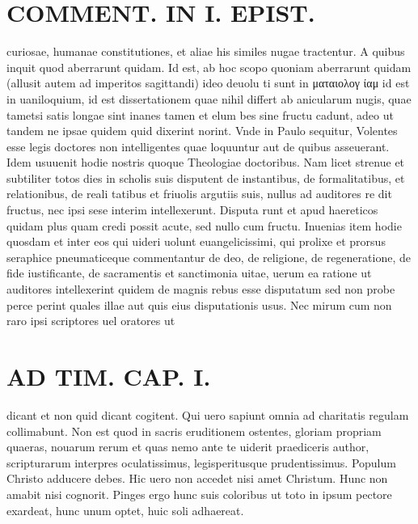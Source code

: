 \documentclass{article}
\begin{document}
\begin{pages}
\section*{COMMENT. IN I. EPIST. }\pstart curiosae, humanae constitutiones, et aliae his similes nugae tractentur. A quibus inquit quod aberrarunt quidam. Id est, ab hoc scopo quoniam aberrarunt quidam (allusit autem ad imperitos sagittandi) ideo deuolu ti sunt in ματαιολογ ίαμ id est in uaniloquium, id est dissertationem quae nihil differt ab anicularum nugis, quae tametsi satis longae sint inanes tamen et elum bes sine fructu cadunt, adeo ut tandem ne ipsae quidem quid dixerint norint. Vnde in Paulo sequitur, Volentes esse legis doctores non intelligentes quae loquuntur aut de quibus asseuerant. Idem usuuenit hodie nostris quoque Theologiae doctoribus. Nam licet strenue et subtiliter totos dies in scholis suis disputent de instantibus, de formalitatibus, et relationibus, de reali tatibus et friuolis argutiis suis, nullus ad auditores re dit fructus, nec ipsi sese interim intellexerunt. Disputa runt et apud haereticos quidam plus quam credi possit acute, sed nullo cum fructu. Inuenias item hodie quosdam et inter eos qui uideri uolunt euangelicissimi, qui prolixe et prorsus seraphice pneumaticeque commentantur de deo, de religione, de regeneratione, de fide iustificante, de sacramentis et sanctimonia uitae, uerum ea ratione ut auditores intellexerint quidem de magnis rebus esse disputatum sed non probe perce perint quales illae aut quis eius disputationis usus. Nec mirum cum non raro ipsi scriptores uel oratores ut  \pend
\section*{AD TIM. CAP. I. }
\marginpar{[ p.100 ]}\pstart dicant et non quid dicant cogitent. Qui uero sapiunt omnia ad charitatis regulam collimabunt. Non est quod in sacris eruditionem ostentes, gloriam propriam quaeras, nouarum rerum et quas nemo ante te uiderit praediceris author, scripturarum interpres oculatissimus, legisperitusque prudentissimus. Populum Christo adducere debes. Hic uero non accedet nisi amet Christum. Hunc non amabit nisi cognorit. Pinges ergo hunc suis coloribus ut toto in ipsum pectore exardeat, hunc unum optet, huic soli adhaereat.  \pend
{}
{}

\end{pages}
\end{document}
